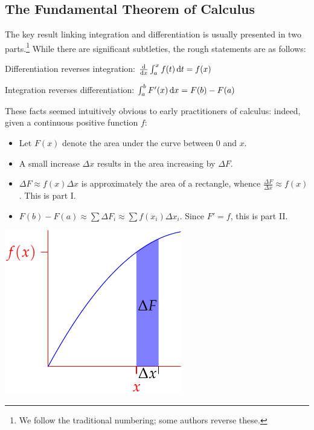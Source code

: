 \begin{exercises}
\begin{enumerate}
\end{enumerate}
\end{exercises}\clearpage

\subsection{The Fundamental Theorem of Calculus}\label{sec:ftc}

The key result linking integration and differentiation is usually presented in two parts.\footnote{We follow the traditional numbering; some authors reverse these.} While there are significant subtleties, the rough statements are as follows:
\begin{description}\itemsep=2pt\parsep=2pt
\item[\normalfont\emph{Part I}] Differentiation reverses integration: $\frac{\mathrm{d} }{\mathrm{d} x}\int_a^xf(t)\,{\mathrm{d} t}=f(x)$
\item[\normalfont\emph{Part II}] Integration reverses differentiation: $\int_a^bF'(x)\,{\mathrm{d} x} =F(b)-F(a)$
\end{description}

\begin{minipage}[t]{0.7\linewidth}\vspace{-10pt}
These facts seemed intuitively obvious to early practitioners of calculus: indeed, given a continuous positive function $f$:
\begin{itemize}%
  \item Let $F(x)$ denote the area under the curve between $0$ and $x$. 
  \item A small increase $\Delta x$ results in the area increasing by $\Delta F$.
  \item $\Delta F\approx f(x)\Delta x$ is approximately the area of a rectangle, whence $\frac{\Delta F}{\Delta x}\approx f(x)$. This is part I.
  \item $F(b)-F(a)\approx\sum \Delta F_i\approx \sum f(x_i)\Delta x_i$. Since $F'=f$, this is part II.
\end{itemize}
\end{minipage}\begin{minipage}[t]{0.3\linewidth}\vspace{-10pt}
\flushright\includegraphics{ftcold}
\end{minipage}\smallbreak

